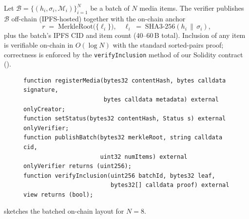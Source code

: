 \documentclass[11pt,a4paper]{article}
\theoremstyle{definition}
\theoremstyle{plain}
\theoremstyle{remark}
\begin{document}
Let $\mathcal{B}=\{(h_i,\sigma_i,\mathcal{M}_i)\}_{i=1}^{N}$ be a batch
of $N$ media items. The verifier publishes $\mathcal{B}$ off-chain
(IPFS-hosted) together with the on-chain anchor
\begin{equation}\label{eq:root}
r\;=\;\mathrm{MerkleRoot}\bigl(\{\ell_i\}\bigr),
\quad
\ell_i\;=\;\mathrm{SHA3\text{-}256}(h_i \,\|\, \sigma_i),
\end{equation}
plus the batch's IPFS CID and item count (40--60\,B total). Inclusion of
any item is verifiable on-chain in $O(\log N)$ with the standard
sorted-pairs proof; correctness is enforced by the
\texttt{verifyInclusion} method of our Solidity contract
().

\begin{figure}[!ht]
\begin{lstlisting}[label=lst:contract,
    caption={Solidity surface of the on-chain registry. The per-item
    path matches the layout of~\cite{bib4}; the batched path is our
    extension.}]
function registerMedia(bytes32 contentHash, bytes calldata signature,
                       bytes calldata metadata) external onlyCreator;
function setStatus(bytes32 contentHash, Status s) external onlyVerifier;
function publishBatch(bytes32 merkleRoot, string calldata cid,
                      uint32 numItems) external onlyVerifier returns (uint256);
function verifyInclusion(uint256 batchId, bytes32 leaf,
                         bytes32[] calldata proof) external view returns (bool);
\end{lstlisting}
\end{figure}

 sketches the batched on-chain layout for $N=8$.
\end{document}
